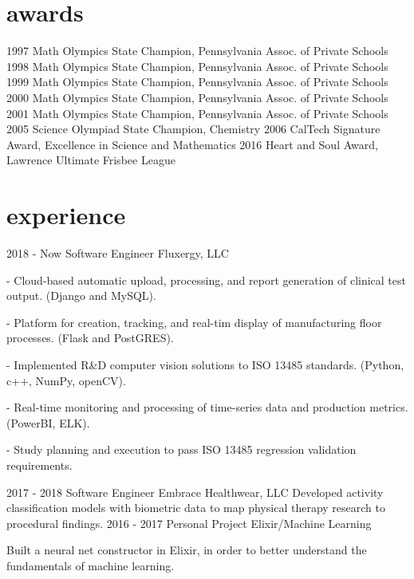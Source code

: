 \documentclass[]{twentysecondcv}
\begin{document}

\section{awards}

\begin{twentyshort}
  \twentyitemshort
    {1997}
    {Math Olympics State Champion, Pennsylvania Assoc. of Private Schools}
  \twentyitemshort
    {1998}
    {Math Olympics State Champion, Pennsylvania Assoc. of Private Schools}
  \twentyitemshort
    {1999}
    {Math Olympics State Champion, Pennsylvania Assoc. of Private Schools}
  \twentyitemshort
    {2000}
    {Math Olympics State Champion, Pennsylvania Assoc. of Private Schools}
  \twentyitemshort
    {2001}
    {Math Olympics State Champion, Pennsylvania Assoc. of Private Schools}
  \twentyitemshort
    {2005}
    {Science Olympiad State Champion, Chemistry}
  \twentyitemshort
    {2006}
    {CalTech Signature Award, Excellence in Science and Mathematics}
  \twentyitemshort
    {2016}
    {Heart and Soul Award, Lawrence Ultimate Frisbee League}
\end{twentyshort}


\section{experience}

\begin{twenty}
  \twentyitem
    {2018 - Now}
    {Software Engineer}
    {Fluxergy, LLC}
    {- Cloud-based automatic upload, processing, and report generation of clinical test output.	(Django and MySQL).

	- Platform for creation, tracking, and real-tim display of manufacturing floor processes. (Flask and PostGRES).
	
	- Implemented R\&D computer vision solutions to ISO 13485 standards. (Python, c++, NumPy, openCV).

	- Real-time monitoring and processing of time-series data and production metrics. (PowerBI, ELK).

	- Study planning and execution to pass ISO 13485 regression validation requirements.
	
}
  \twentyitem
    {2017 - 2018}
    {Software Engineer}
    {Embrace Healthwear, LLC}
    {Developed activity classification models with biometric data to map physical therapy research to procedural findings.} 
  \twentyitem
    {2016 - 2017}
    {Personal Project}
    {Elixir/Machine Learning}
    {Built a neural net constructor in Elixir, in order to better understand the fundamentals of machine learning. 

} 
\end{twenty}
\end{document}
